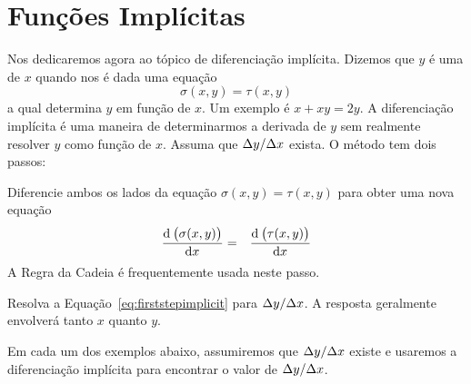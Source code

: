 \section{Funções Implícitas}
\label{sec:implicitfunc}

Nos dedicaremos agora ao tópico de diferenciação implícita. Dizemos que
$y$ é uma  de $x$ quando nos é dada uma equação
$$
  \sigma(x, y) = \tau(x, y)
$$
a qual determina $y$ em função de $x$. Um exemplo é $x + xy = 2y$. A
diferenciação implícita é uma maneira de determinarmos a derivada de $y$
sem realmente resolver $y$ como função de $x$. Assuma que $\Delta{y}/\Delta{x}$ exista.
O método tem dois passos:
\begin{stepanalysis}
\item Diferencie ambos os lados da equação $\sigma(x, y) = \tau(x, y)$
para obter uma nova equação
\begin{eqnarray}
  \dod{\left(\sigma(x, y)\right)}{x} & = & \dod{\left(\tau(x, y)\right)}{x}
  \label{eq:firststepimplicit}
\end{eqnarray}
A Regra da Cadeia é frequentemente usada neste passo.
\item Resolva a Equação~\ref{eq:firststepimplicit} para $\Delta{y}/\Delta{x}$. A resposta
geralmente envolverá tanto $x$ quanto $y$.
\end{stepanalysis}

Em cada um dos exemplos abaixo, assumiremos que $\Delta{y}/\Delta{x}$ existe e usaremos
a diferenciação implícita para encontrar o valor de $\Delta{y}/\Delta{x}$.

